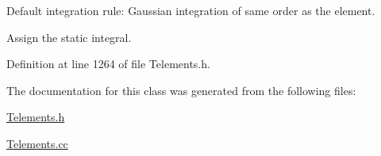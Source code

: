 Default integration rule\+: Gaussian integration of same \textquotesingle{}order\textquotesingle{} as the element. 

Assign the static integral. 

Definition at line 1264 of file Telements.\+h.



The documentation for this class was generated from the following files\+:\begin{DoxyCompactItemize}
\item 
\hyperlink{Telements_8h}{Telements.\+h}\item 
\hyperlink{Telements_8cc}{Telements.\+cc}\end{DoxyCompactItemize}
